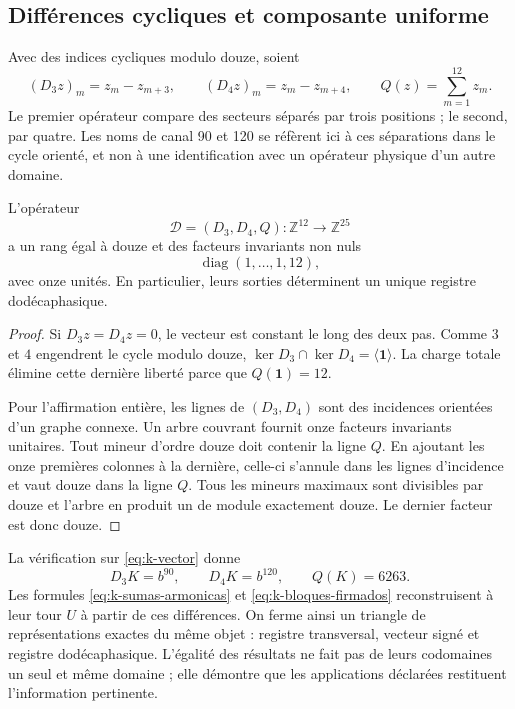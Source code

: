 \subsection{Différences cycliques et composante uniforme}
\label{subsec:k-transversal}

Avec des indices cycliques modulo douze, soient
\[
 (D_3z)_m=z_m-z_{m+3},\qquad(D_4z)_m=z_m-z_{m+4},
 \qquad Q(z)=\sum_{m=1}^{12}z_m.
\]
Le premier opérateur compare des secteurs séparés par trois positions ; le
second, par quatre. Les noms de canal 90 et 120 se réfèrent ici à
ces séparations dans le cycle orienté, et non à une identification avec un
opérateur physique d'un autre domaine.

\begin{proposition}
\label{prop:k-transversal}
L'opérateur
\[
 \mathcal D=(D_3,D_4,Q):\mathbb Z^{12}\longrightarrow\mathbb Z^{25}
\]
a un rang égal à douze et des facteurs invariants non nuls
\[
 \operatorname{diag}(1,\ldots,1,12),
\]
avec onze unités. En particulier, leurs sorties déterminent un unique registre dodécaphasique.
\end{proposition}

\begin{proof}
Si \(D_3z=D_4z=0\), le vecteur est constant le long des deux pas.
Comme \(3\) et \(4\) engendrent le cycle modulo douze,
\(\ker D_3\cap\ker D_4=\langle\mathbf1\rangle\). La charge totale
élimine cette dernière liberté parce que \(Q(\mathbf1)=12\).

Pour l'affirmation entière, les lignes de \((D_3,D_4)\) sont des incidences orientées d'un graphe connexe. Un arbre couvrant fournit onze facteurs invariants unitaires. Tout mineur d'ordre douze doit contenir la ligne \(Q\). En ajoutant les onze premières colonnes à la dernière, celle-ci s'annule dans les lignes d'incidence et vaut douze dans la ligne \(Q\). Tous les mineurs maximaux sont divisibles par douze et l'arbre en produit un de module exactement douze. Le dernier facteur est donc douze.
\end{proof}

La vérification sur \eqref{eq:k-vector} donne
\[
 D_3K=b^{90},\qquad D_4K=b^{120},\qquad Q(K)=6263.
\]
Les formules \eqref{eq:k-sumas-armonicas} et
\eqref{eq:k-bloques-firmados} reconstruisent à leur tour \(U\) à partir de ces
différences. On ferme ainsi un triangle de représentations exactes du
même objet : registre transversal, vecteur signé et registre dodécaphasique. L'égalité
des résultats ne fait pas de leurs codomaines un seul et même domaine ; elle démontre que
les applications déclarées restituent l'information pertinente.

